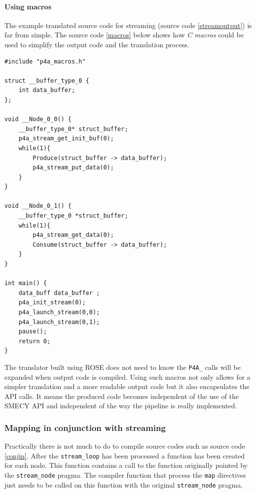 \documentclass[a4paper]{article}
\begin{document}
	
 
 	\paragraph{Using macros}
	
	The example translated source code for streaming (source code \ref{streamoutput}) is far from simple. The source code \ref{macros} below shows how
    \emph{C macros} could be used to simplify the output code and the translation process.

	\begin{lstlisting}[label=macros,caption={Streaming output code with
macro calls. The definitions of \texttt{Produce} and \texttt{Consume} functions are not shown.}]
#include "p4a_macros.h" 

struct __buffer_type_0 {
	int data_buffer;
};

void __Node_0_0() {
	__buffer_type_0* struct_buffer;
	p4a_stream_get_init_buf(0);
	while(1){
		Produce(struct_buffer -> data_buffer);
		p4a_stream_put_data(0);
	}
}

void __Node_0_1() {
	__buffer_type_0 *struct_buffer;
	while(1){
		p4a_stream_get_data(0);
		Consume(struct_buffer -> data_buffer);
	}
}

int main() {
	data_buff data_buffer ;
	p4a_init_stream(0);
	p4a_launch_stream(0,0);
	p4a_launch_stream(0,1);
	pause();
	return 0;
}
	\end{lstlisting}

	The translator built using ROSE does not need to know the \verb+P4A_+
    calls will be expanded when output code is compiled. Using such macros
    not only allows for a simpler translation and a more readable output
    code but it also encapsulates the API calls. It means the produced
    code becomes independent of the use of the SMECY API and independent
    of the way the pipeline is really implemented.
    
    \subsubsection{Mapping in conjunction with streaming}
 Practically there is not much to do to compile source codes such as source code \ref{conjin}. After the \verb+stream_loop+ has been processed a function has been created for each node. This function contains a call to the function originally pointed by the \verb+stream_node+ pragma. The compiler function that process the \verb+map+ directives just needs to be called on this function with the original \verb+stream_node+ pragma.
\end{document}
